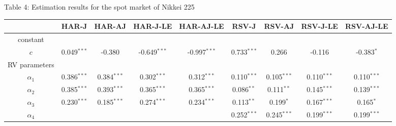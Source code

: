 \documentclass[10pt]{article}
\begin{document}
\newpage
\fontsize{11pt}{14pt}\selectfont
\begin{landscape}
\begin{center}
Table 4: Estimation results for the spot market of Nikkei 225
\end{center}

\begin{center}
\begin{tabular}{c|cccc|cccc} \hline       
                 &HAR-J                         &HAR-AJ                    &HAR-J-LE                     & HAR-AJ-LE                &RSV-J                          &RSV-AJ                       &RSV-J-LE                       & RSV-AJ-LE           \\ \hline 
constant     &                                   &                                  &                                  &                                   &                                   &                                 &                                   &                              \\
$c$            &0.049$^{\ast \ast \ast}$&-0.380                        &-0.649$^{\ast \ast \ast}$   &-0.997$^{\ast \ast \ast}$&0.733$^{\ast \ast\ast }$   &0.266                          &-0.116                          &-0.383$^{\ast}$          \\
RV parameters&           &           &           &            &            &            &              &                 \\
$\alpha_1$  &0.386$^{\ast \ast \ast}$ &0.384$^{\ast \ast \ast}$&0.302$^{\ast \ast \ast}$   &0.312$^{\ast \ast \ast}$   &0.110$^{\ast \ast \ast}$  &0.105$^{\ast \ast \ast}$& 0.110$^{\ast \ast \ast}$& 0.110$^{\ast \ast \ast}$\\
$\alpha_2$  &0.385$^{\ast \ast \ast}$ &0.393$^{\ast \ast \ast}$&0.365$^{\ast \ast \ast}$   &0.365$^{\ast \ast \ast}$   &0.086$^{\ast \ast}$         &0.111$^{\ast \ast}$       & 0.145$^{\ast \ast \ast}$ &0.139$^{\ast \ast \ast}$\\
$\alpha_3$  &0.230$^{\ast \ast \ast}$ &0.185$^{\ast \ast \ast}$&0.274$^{\ast \ast \ast}$   &0.234$^{\ast \ast \ast}$   &0.113$^{\ast \ast}$         &0.199$^{\ast }$            & 0.167$^{\ast \ast \ast}$&0.165$^{\ast }$               \\  
$\alpha_4$  &                                 &                                  &                                   &                                    &0.252$^{\ast \ast \ast}$  &0.245$^{\ast \ast \ast}$& 0.199$^{\ast \ast \ast}$ &0.199$^{\ast \ast \ast}$\\

\end{tabular}
\end{center}
\end{landscape}
\end{document}
